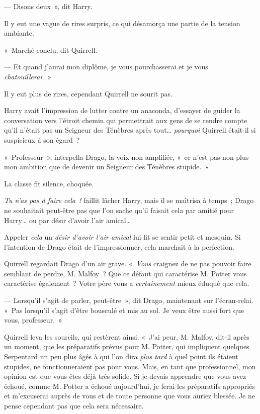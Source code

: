 --- Disons deux~», dit Harry.

Il y eut une vague de rires surpris, ce qui désamorça une partie de la tension ambiante.

«~Marché conclu, dit Quirrell.

--- Et quand j'aurai mon diplôme, je vous pourchasserai et je vous \emph{chatouillerai}.~»

Il y eut plus de rires, cependant Quirrell ne sourit pas.

Harry avait l'impression de lutter contre un anaconda, d'essayer de guider la conversation vers l'étroit chemin qui permettrait aux gens de se rendre compte qu'il n'était pas un Seigneur des Ténèbres après tout…
\emph{pourquoi} Quirrell était-il si suspicieux à son égard~?

«~Professeur~», interpella Drago, la voix non amplifiée, «~ce n'est pas non plus mon ambition que de devenir un Seigneur des Ténèbres stupide.~»

La classe fit silence, choquée.

\emph{Tu n'as pas à faire cela~!} faillit lâcher Harry, mais il se maîtrisa à temps~;
Drago ne souhaitait peut-être pas que l'on sache qu'il faisait cela par amitié pour Harry… ou par désir d'avoir l'air amical…

Appeler \emph{cela} un \emph{désir d'avoir l'air amical} lui fit se sentir petit et mesquin.
Si l'intention de Drago était de l'impressionner, cela marchait à la perfection.

Quirrell regardait Drago d'un air grave.
«~\emph{Vous} craignez de ne pas pouvoir faire semblant de perdre, M. Malfoy~?
Que ce défaut qui caractérise M. Potter vous caractérise également~?
Votre père vous a \emph{certainement} mieux éduqué que cela.

--- Lorsqu'il s'agit de parler, peut-être~», dit Drago, maintenant sur l'écran-relai.
«~Pas lorsqu'il s'agit d'être bousculé et mis au sol.
Je veux être aussi fort que vous, professeur.~»

Quirrell leva les sourcils, qui restèrent ainsi.
«~J'ai peur, M. Malfoy, dit-il après un moment, que les préparatifs prévus pour M. Potter, qui impliquent quelques Serpentard un peu plus âgés à qui l'on dira \emph{plus tard} à quel point ils étaient stupides, ne fonctionneraient pas pour vous.
Mais, en tant que professionnel, mon opinion est que vous êtes déjà très solide.
Si je devais apprendre que vous avez échoué, comme M. Potter a échoué aujourd'hui, je ferai les préparatifs appropriés et m'excuserai auprès de vous et de toute personne que vous auriez blessée.
Je ne pense cependant pas que cela sera nécessaire.

